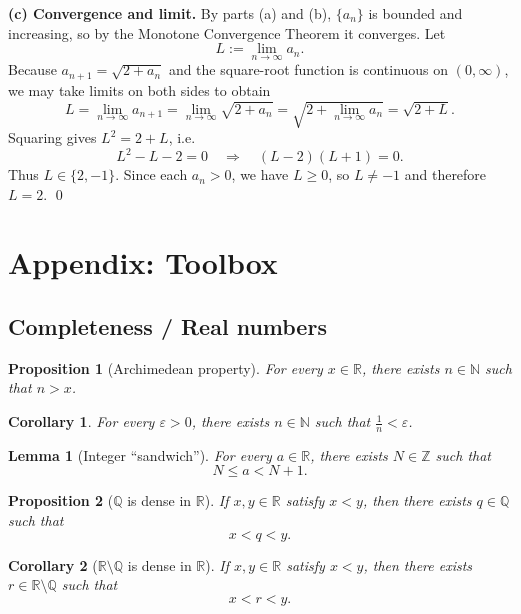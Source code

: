\documentclass[12pt]{article}
\newtheorem*{lemma}{Lemma}
\newtheorem{proposition}{Proposition}
\newtheorem{corollary}{Corollary}
\begin{document}
\textbf{(c) Convergence and limit.} By parts (a) and (b), $\{a_n\}$ is bounded and increasing, so by the Monotone Convergence Theorem it converges. Let
\[L:=\lim_{n\to\infty} a_n.\]
Because $a_{n+1}=\sqrt{2+a_n}$ and the square-root function is continuous on $(0,\infty)$, we may take limits on both sides to obtain
\[
L=\lim_{n\to\infty} a_{n+1}=\lim_{n\to\infty}\sqrt{2+a_n}=\sqrt{2+\lim_{n\to\infty}a_n}=\sqrt{2+L}.
\]
Squaring gives $L^2=2+L$, i.e.
\[
L^2-L-2=0 \quad\Longrightarrow\quad (L-2)(L+1)=0.
\]
Thus $L\in\{2,-1\}$. Since each $a_n>0$, we have $L\ge 0$, so $L\ne -1$ and therefore $L=2$.
\qed

\newpage
\appendix
\section*{Appendix: Toolbox}

\subsection*{Completeness / Real numbers}

\begin{proposition}[Archimedean property]
For every $x\in\mathbb{R}$, there exists $n\in\mathbb{N}$ such that $n>x$.
\end{proposition}

\begin{corollary}
For every $\varepsilon>0$, there exists $n\in\mathbb{N}$ such that $\frac{1}{n}<\varepsilon$.
\end{corollary}

\begin{lemma}[Integer ``sandwich'']
For every $a\in\mathbb{R}$, there exists $N\in\mathbb{Z}$ such that
\[
N\le a < N+1.
\]
\end{lemma}

\begin{proposition}[$\mathbb{Q}$ is dense in $\mathbb{R}$]
If $x,y\in\mathbb{R}$ satisfy $x<y$, then there exists $q\in\mathbb{Q}$ such that
\[
x<q<y.
\]
\end{proposition}

\begin{corollary}[$\mathbb{R}\setminus\mathbb{Q}$ is dense in $\mathbb{R}$]
If $x,y\in\mathbb{R}$ satisfy $x<y$, then there exists $r\in\mathbb{R}\setminus\mathbb{Q}$ such that
\[
x<r<y.
\]
\end{corollary}
\end{document}
